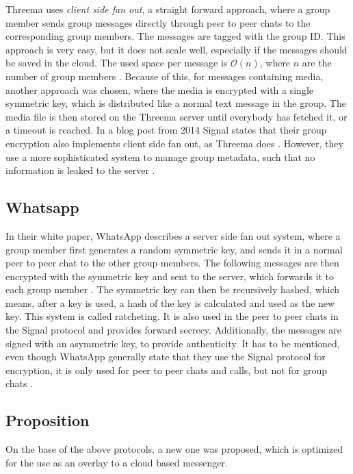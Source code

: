 \documentclass[a4paper, oneside]{discothesis}
\begin{document}
Threema uses \emph{client side fan out}, a straight forward approach, where a group member sends group messages directly through peer to peer chats to the corresponding group members. The messages are tagged with the group ID. This approach is very easy, but it does not scale well, especially if the messages should be saved in the cloud. The used space per message is $\mathcal{O}(n)$, where $n$ are the number of group members \cite{Threema}. Because of this, for messages containing media, another approach was chosen, where the media is encrypted with a single symmetric key, which is distributed like a normal text message in the group. The media file is then stored on the Threema server until everybody has fetched it, or a timeout is reached.
In a blog post from 2014 Signal states that their group encryption also implements client side fan out, as Threema does \cite{SignalGroupsOld}. However, they use a more sophisticated system to manage group metadata, such that no information is leaked to the server \cite{SignalGroupsNew}.

\subsection{Whatsapp}

In their white paper, WhatsApp describes a server side fan out system, where a group member first generates a random symmetric key, and sends it in a normal peer to peer chat to the other group members. The following messages are then encrypted with the symmetric key and sent to the server, which forwards it to each group member \cite{Whatsapp}. The symmetric key can then be recursively hashed, which means, after a key is used, a hash of the key is calculated and used as the new key. This system is called ratcheting. It is also used in the peer to peer chats in the Signal protocol and provides forward secrecy. Additionally, the messages are signed with an asymmetric key, to provide authenticity. It has to be mentioned, even though WhatsApp generally state that they use the Signal protocol for encryption, it is only used for peer to peer chats and calls, but not for group chats \cite{Newbedev}.

\subsection{Proposition}
On the base of the above protocols, a new one was proposed, which is optimized for the use as an overlay to a cloud based messenger.
\end{document}
